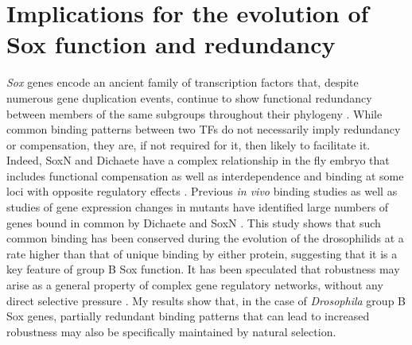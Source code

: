 \section{Implications for the evolution of Sox function and redundancy}
\emph{Sox} genes encode an ancient family of transcription factors that, despite numerous gene duplication events, continue to show functional redundancy between members of the same subgroups throughout their phylogeny \citep{bhattaram_organogenesis_2010,ferri_sox2_2004,guth_having_2008,matsui_redundant_2006,nishiguchi_sox1_1998,okuda_b1_2010,overton_evidence_2002,rizzoti_sox3_2004,uchikawa_b1_2011,uwanogho_embryonic_1995,wegner_stem_2005,wood_comparative_1999}. While common binding patterns between two TFs do not necessarily imply redundancy or compensation, they are, if not required for it, then likely to facilitate it. Indeed, SoxN and Dichaete have a complex relationship in the fly embryo that includes functional compensation as well as interdependence and binding at some loci with opposite regulatory effects \citep{ferrero_soxneuro_2014,overton_evidence_2002}. Previous \emph{in vivo} binding studies as well as studies of gene expression changes in mutants have identified large numbers of genes bound in common by Dichaete and SoxN \citep{aleksic_role_2013,ferrero_soxneuro_2014}. This study shows that such common binding has been conserved during the evolution of the drosophilids at a rate higher than that of unique binding by either protein, suggesting that it is a key feature of group B Sox function. It has been speculated that robustness may arise as a general property of complex gene regulatory networks, without any direct selective pressure \citep{aldana_robustness_2007}. My results show that, in the case of \emph{Drosophila} group B Sox genes, partially redundant binding patterns that can lead to increased robustness may also be specifically maintained by natural selection.

